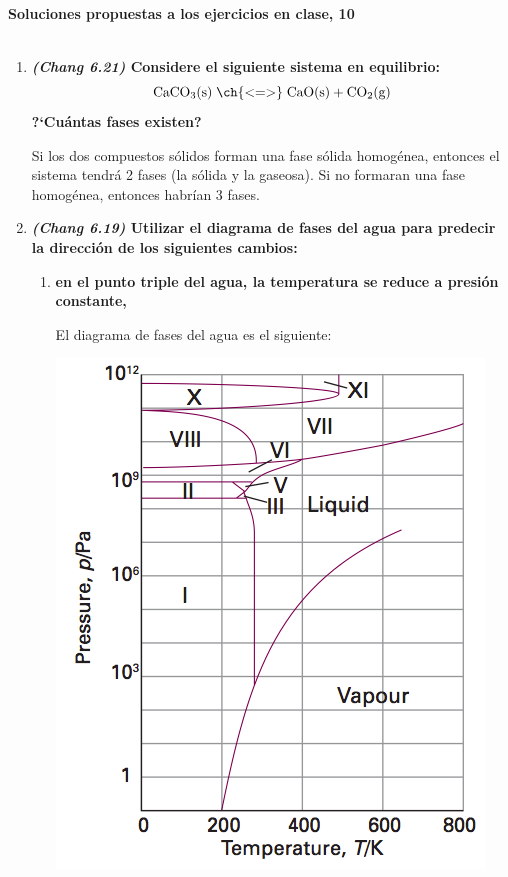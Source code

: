 \documentclass[a4paper,12pt]{article}
\begin{document}

\begin{center}
\HRule \\[0.4cm]
{ \bfseries Soluciones propuestas a los ejercicios en clase, 10}\\ %
\HRule \\[0.4cm]
\end{center}


\begin{enumerate}

 \item \textbf{\textit{(Chang 6.21)} Considere el siguiente sistema en equilibrio:}
$$\mbox{CaCO}_3\mbox{(s)}\;\ch{ <=> }\;\mbox{CaO(s)}+\mbox{CO}_2\mbox{(g)}$$
\textbf{?`Cu\'antas fases existen?} %

Si los dos compuestos s\'olidos forman una fase s\'olida homog\'enea, entonces el sistema tendr\'a 2 fases (la s\'olida y la gaseosa). Si no formaran una fase homog\'enea, entonces habr\'ian 3 fases.

 \item \textbf{\textit{(Chang 6.19)} Utilizar el diagrama de fases del agua para predecir la direcci\'on de los siguientes cambios:}
 \begin{enumerate}
  \item \textbf{en el punto triple del agua, la temperatura se reduce a presi\'on constante,}

El diagrama de fases del agua es el siguiente:

\begin{center}
 \includegraphics[scale=0.5]{figure9.png}
\end{center}


\end{enumerate}
\end{enumerate}
\end{document}
